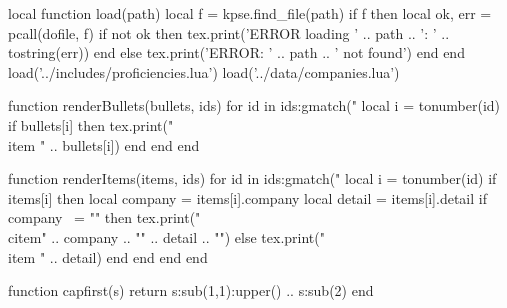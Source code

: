 \begin{luacode}
  local function load(path)
    local f = kpse.find_file(path)
    if f then
      local ok, err = pcall(dofile, f)
      if not ok then tex.print('ERROR loading ' .. path .. ': ' .. tostring(err)) end
    else
      tex.print('ERROR: ' .. path .. ' not found')
    end
  end
  load('../includes/proficiencies.lua')
  load('../data/companies.lua')
\end{luacode}

\begin{luacode}
  function renderBullets(bullets, ids)
    for id in ids:gmatch("%
      local i = tonumber(id)
      if bullets[i] then
        tex.print("\\item " .. bullets[i])
      end
    end
  end

  function renderItems(items, ids)
    for id in ids:gmatch("%
      local i = tonumber(id)
      if items[i] then
        local company = items[i].company
        local detail = items[i].detail
        if company ~= "" then
          tex.print("\\citem{" .. company .. "}{" .. detail .. "}")
        else
          tex.print("\\item " .. detail)
        end
      end
    end
  end
\end{luacode}

\def\lv#1{\directlua{tex.print(#1)}}

\begin{luacode}
  function capfirst(s)
    return s:sub(1,1):upper() .. s:sub(2)
  end
\end{luacode}
